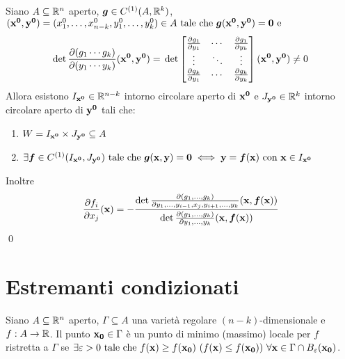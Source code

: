 \begin{theorem}
    Siano $A\subseteq \mathbb{R}^n$ aperto, $\bm g \in C^{(1)}(A,\mathbb{R}^k)$, $(\vb{x^0}, \vb{y^0})=(x_1^0,\dots,x_{n-k}^0,y_1^0,\dots,y_{k}^0) \in A \text{ tale che } \bm g(\vb{x^0}, \vb{y^0})=\vb{0} \text{ e }$
    \begin{equation*}
        \det\frac{\partial(g_1\cdots g_k)}{\partial (y_1 \cdots y_k)}(\vb{x^0}, \vb{y^0})=\\
        \det\begin{bmatrix}
            \frac{\partial g_1}{\partial y_1} & \cdots & \frac{\partial g_1}{\partial y_k}\\
            \vdots & \ddots & \vdots \\
            \frac{\partial g_k}{\partial y_1} & \cdots & \frac{\partial g_k}{\partial y_k}
        \end{bmatrix}
        (\vb{x^0}, \vb{y^0}) \neq 0
    \end{equation*}
    Allora esistono $I_{\vb{x^0}} \in \mathbb{R}^{n-k}$ intorno circolare aperto di $\vb{x^0}$ e $J_{\vb{y^0}} \in \mathbb{R}^k$ intorno circolare aperto di $\vb{y^0}$ tali che:
    \begin{enumerate}
        \item $W=I_{\vb{x^0}}\times J_{\vb{y^0}} \subseteq A$
        \item $\exists \bm f \in C^{(1)}(I_{\vb{x^0}}, J_{\vb{y^0}}) \text{ tale che } \bm g(\vb{x}, \vb{y})=\vb{0} \iff \vb{y} = \bm f (\vb{x}) \text{ con } \vb{x} \in I_{\vb{x^0}}$
    \end{enumerate}
    Inoltre
    \begin{equation*}
        \frac{\partial f_i}{\partial x_j}(\vb{x})=-\frac
        {\det \frac{\partial (g_1,\dots,g_k)}{\partial y_1,\dots,y_{i-1},x_j,y_{i+1},\dots,y_k}(\vb{x},\bm f(\vb{x}))}
        {\det \frac{\partial (g_1,\dots,g_k)}{\partial y_1,\dots,y_k}(\vb{x},\bm f(\vb{x}))}
    \end{equation*}
    \qed
\end{theorem}

\section{Estremanti condizionati}

\begin{definition}
    Siano $A\subseteq\mathbb{R}^n$ aperto, $\Gamma \subseteq A$ una varietà regolare $(n-k)$-dimensionale e $f: A\to\mathbb{R}$. Il punto $\vb{x_0} \in \Gamma$ è un punto di minimo (massimo) locale per $f$ ristretta a $\Gamma$ se $\exists \varepsilon > 0 \text{ tale che } f(\vb{x}) \geq f(\vb{x_0}) \ (f(\vb{x}) \leq f(\vb{x_0})) \ \forall \vb{x} \in \Gamma \cap B_\varepsilon(\vb{x_0})$.
\end{definition}

